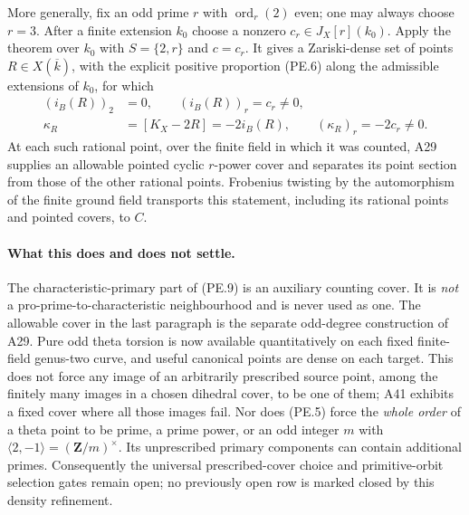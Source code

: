 More generally, fix an odd prime $r$ with
$\operatorname{ord}_r(2)$ even; one may always choose $r=3$.
After a finite extension $k_0$ choose a nonzero
$c_r\in J_X[r](k_0)$. Apply the theorem over $k_0$ with
$S=\{2,r\}$ and $c=c_r$. It gives a Zariski-dense set of
points $R\in X(\overline k)$, with the explicit positive
proportion (PE.6) along the admissible extensions of $k_0$, for
which
\[
 \begin{aligned}
 (i_B(R))_2&=0,\qquad (i_B(R))_r=c_r\ne0,\\
 \kappa_R&=[K_X-2R]=-2i_B(R),\qquad
                  (\kappa_R)_r=-2c_r\ne0.
 \end{aligned}
 \tag{PE.15}
\]
At each such rational point, over the finite field in which it
was counted, A29 supplies an allowable pointed cyclic
$r$-power cover and separates its point section from those of
the other rational points. Frobenius twisting by the automorphism
of the finite ground field transports this statement, including
its rational points and pointed covers, to $C$.

\paragraph{What this does and does not settle.}
The characteristic-primary part of (PE.9) is an auxiliary
counting cover. It is \emph{not} a pro-prime-to-characteristic
neighbourhood and is never used as one. The allowable cover in
the last paragraph is the separate odd-degree construction of
A29. Pure odd theta torsion is now available quantitatively on
each fixed finite-field genus-two curve, and useful canonical
points are dense on each target. This does not force any image
of an arbitrarily prescribed source point, among the finitely
many images in a chosen dihedral cover, to be one of them;
A41 exhibits a fixed cover where all those images fail.
Nor does (PE.5) force the \emph{whole order} of a theta point
to be prime, a prime power, or an odd integer $m$ with
$\langle2,-1\rangle=(\mathbf Z/m)^\times$. Its unprescribed
primary components can contain additional primes. Consequently
the universal prescribed-cover choice and primitive-orbit
selection gates remain open; no previously open row is marked
closed by this density refinement.
